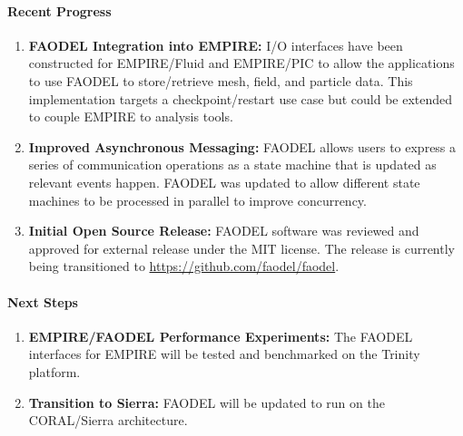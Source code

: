 \paragraph{Recent Progress}
\begin{enumerate}
  \item \textbf{FAODEL Integration into EMPIRE:} I/O interfaces have been constructed for EMPIRE/Fluid and EMPIRE/PIC to allow the applications to use FAODEL to store/retrieve mesh, field, and particle data. This implementation targets a checkpoint/restart use case but could be extended to couple EMPIRE to analysis tools.
  \item \textbf{Improved Asynchronous Messaging:} FAODEL allows users to express a series of communication operations as a state machine that is updated as relevant events happen. FAODEL was updated to allow different state machines to be processed in parallel to improve concurrency.
  \item \textbf{Initial Open Source Release:} FAODEL software was reviewed and approved for external release under the MIT license. The release is currently being transitioned to \url{https://github.com/faodel/faodel}.
\end{enumerate}


\paragraph{Next Steps}
\begin{enumerate}
  \item \textbf{EMPIRE/FAODEL Performance Experiments:} The FAODEL interfaces for EMPIRE will be tested and benchmarked on the Trinity platform. 
  \item \textbf{Transition to Sierra:} FAODEL will be updated to run on the CORAL/Sierra architecture.
\end{enumerate}
